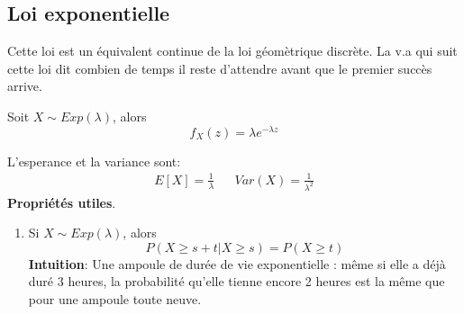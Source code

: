 \documentclass[a4paper]{article}
\begin{document}
\subsection{Loi exponentielle}
Cette loi est un équivalent continue de la loi géomètrique discrète.
La v.a qui suit cette loi dit combien de temps il reste d'attendre avant que le
premier succès arrive.

Soit $X \sim Exp(\lambda)$, alors
 \[
     f_X(z) = \lambda e^{-\lambda z}
\] 

L'esperance et la variance sont:
\begin{align*}
    E[X] = \frac{1}{\lambda} & & Var(X) = \frac{1}{\lambda^2}
\end{align*}
\textbf{Propriétés utiles}.
\begin{enumerate}
    \item Si $X \sim Exp(\lambda)$, alors
         \[
        P(X \ge s + t | X \ge s) = P(X \ge t)
        \] 
        \textbf{Intuition}: Une ampoule de durée de vie exponentielle :
        même si elle a déjà duré 3 heures, la probabilité qu’elle tienne
        encore 2 heures est la même que pour une ampoule toute neuve.
\end{enumerate}
\end{document}
